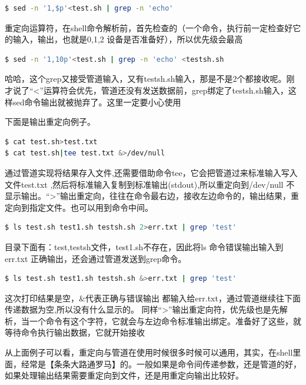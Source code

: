 \documentclass[doctor,openright,twoside]{sjtuthesis}
\theoremstyle{plain}
\theoremstyle{definition}
\theoremstyle{remark}
\theoremstyle{ocrenumbox}
\theoremstyle{plain}
\begin{document}
\begin{lstlisting}[language=bash]
$ sed -n '1,$p'<test.sh | grep -n 'echo'
\end{lstlisting}

重定向运算符，在shell命令解析前，首先检查的（一个命令，执行前一定检查好它的输入，输出，也就是0,1,2
设备是否准备好），所以优先级会最高

\begin{lstlisting}[language=bash]
$ sed -n '1,10p'<test.sh | grep -n 'echo' <testsh.sh
\end{lstlisting}

哈哈，这个grep又接受管道输入，又有testsh.sh输入，那是不是2个都接收呢。刚才说了``\textless{}''运算符会优先，管道还没有发送数据前，grep绑定了testsh.sh输入，这样sed命令输出就被抛弃了。这里一定要小心使用

下面是输出重定向例子。

\begin{lstlisting}[language=bash]
$ cat test.sh>test.txt
$ cat test.sh|tee test.txt &>/dev/null
\end{lstlisting}

通过管道实现将结果存入文件,还需要借助命令tee，它会把管道过来标准输入写入文件test.txt
,然后将标准输入复制到标准输出(stdout),所以重定向到/dev/null
不显示输出。``\textgreater{}''输出重定向，往往在命令最右边，接收左边命令的，输出结果，重定向到指定文件。也可以用到命令中间。

\begin{lstlisting}[language=bash]
$ ls test.sh test1.sh testsh.sh 2>err.txt | grep 'test'
\end{lstlisting}

目录下面有：test,testsh文件，test1.sh不存在，因此将ls
命令错误输出输入到err.txt 正确输出，还会通过管道发送到grep命令。

\begin{lstlisting}[language=bash]
$ ls test.sh test1.sh testsh.sh &>err.txt | grep 'test'
\end{lstlisting}

这次打印结果是空，\&代表正确与错误输出
都输入给err.txt，通过管道继续往下面传递数据为空,所以没有什么显示的。
同样``\textgreater{}''输出重定向符，优先级也是先解析，当一个命令有这个字符，它就会与左边命令标准输出绑定。准备好了这些，就等待命令执行输出数据，它就开始接收

从上面例子可以看，重定向与管道在使用时候很多时候可以通用，其实，在shell里面，经常是【条条大路通罗马】的。一般如果是命令间传递参数，还是管道的好，如果处理输出结果需要重定向到文件，还是用重定向输出比较好。
\end{document}
